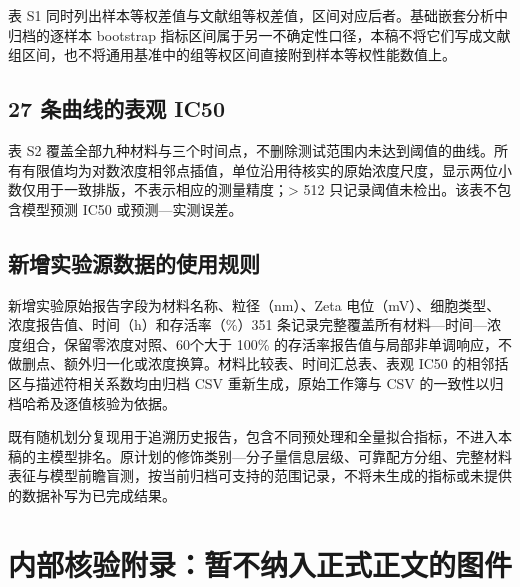 \documentclass[letterpaper]{article}
\begin{document}
表 S1 同时列出样本等权差值与文献组等权差值，区间对应后者。基础嵌套分析中归档的逐样本 bootstrap 指标区间属于另一不确定性口径，本稿不将它们写成文献组区间，也不将通用基准中的组等权区间直接附到样本等权性能数值上。

\begin{table}[H]
\centering
\caption{各配置相对对应基线的配对 MAE 差值，单位为存活率百分点。负值表示误差下降，区间来自 24 个文献组等权差值的 5000 次 bootstrap。}
\label{tab:paired_comparisons}
\small

\end{table}

\subsection{27 条曲线的表观 IC50}

表 S2 覆盖全部九种材料与三个时间点，不删除测试范围内未达到阈值的曲线。所有有限值均为对数浓度相邻点插值，单位沿用待核实的原始浓度尺度，显示两位小数仅用于一致排版，不表示相应的测量精度；> 512 只记录阈值未检出。该表不包含模型预测 IC50 或预测—实测误差。

\begin{table}[H]
\centering
\caption{HUVEC 材料—时间曲线的表观 IC50，采用原始浓度尺度。重复次数与汇总方法待核实。}
\label{tab:huvec_ic50}
\small

\end{table}

\subsection{新增实验源数据的使用规则}

新增实验原始报告字段为材料名称、粒径（nm）、Zeta 电位（mV）、细胞类型、浓度报告值、时间（h）和存活率（\%）351 条记录完整覆盖所有材料—时间—浓度组合，保留零浓度对照、60个大于 100\% 的存活率报告值与局部非单调响应，不做删点、额外归一化或浓度换算。材料比较表、时间汇总表、表观 IC50 的相邻括区与描述符相关系数均由归档 CSV 重新生成，原始工作簿与 CSV 的一致性以归档哈希及逐值核验为依据。

既有随机划分复现用于追溯历史报告，包含不同预处理和全量拟合指标，不进入本稿的主模型排名。原计划的修饰类别—分子量信息层级、可靠配方分组、完整材料表征与模型前瞻盲测，按当前归档可支持的范围记录，不将未生成的指标或未提供的数据补写为已完成结果。

\FloatBarrier
\section*{内部核验附录：暂不纳入正式正文的图件}
\end{document}
